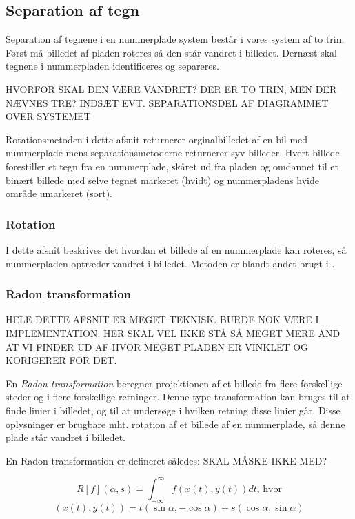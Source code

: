 \subsection{Separation af tegn}

Separation af tegnene i en nummerplade system består i vores system af to trin: Først må billedet af pladen roteres så den står vandret i billedet. Dernæst skal tegnene i nummerpladen identificeres og separeres.

HVORFOR SKAL DEN VÆRE VANDRET?
DER ER TO TRIN, MEN DER NÆVNES TRE?
INDSÆT EVT. SEPARATIONSDEL AF DIAGRAMMET OVER SYSTEMET

Rotationsmetoden i dette afsnit returnerer orginalbilledet af en bil med nummerplade mens separationsmetoderne returnerer syv billeder. Hvert billede forestiller et tegn fra en nummerplade, skåret ud fra pladen og omdannet til et binært billede med selve tegnet markeret (hvidt) og nummerpladens hvide område umarkeret (sort).

\subsubsection{Rotation}

I dette afsnit beskrives det hvordan et billede af en nummerplade kan roteres, så nummerpladen optræder vandret i billedet. Metoden er blandt andet brugt i \cite{shapiro}.

\subsubsection*{Radon transformation}
HELE DETTE AFSNIT ER MEGET TEKNISK. BURDE NOK VÆRE I IMPLEMENTATION. HER SKAL VEL IKKE STÅ SÅ MEGET MERE AND AT VI FINDER UD AF HVOR MEGET PLADEN ER VINKLET OG KORIGERER FOR DET.

En \textit{Radon transformation} beregner projektionen af et billede fra flere forskellige steder og i flere forskellige retninger\cite{matlab_radon}. Denne type transformation kan bruges til at finde linier i billedet, og til at undersøge i hvilken retning disse linier går. Disse oplysninger er brugbare mht. rotation af et billede af en nummerplade, så denne plade står vandret i billedet.

En Radon transformation er defineret således\cite{wiki_radon}: SKAL MÅSKE IKKE MED?

\begin{displaymath}
		R[f](\alpha,s) = \int_{-\infty}^{\infty}f(x(t),y(t))dt \text{, hvor}
\end{displaymath}
\begin{displaymath}
		(x(t),y(t)) = t(\sin\alpha, -\cos\alpha)+s(\cos\alpha,\sin\alpha)
\end{displaymath}

